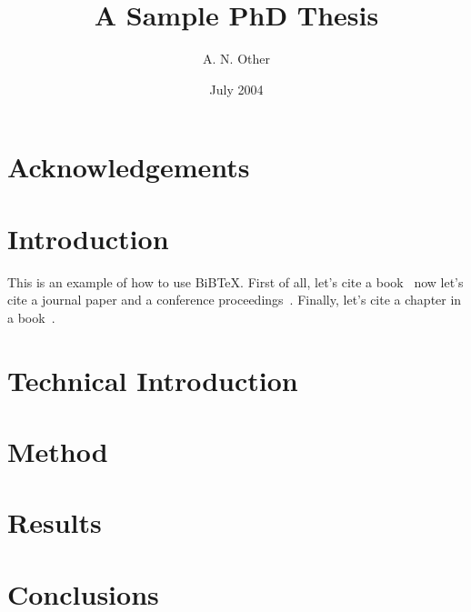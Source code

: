 \documentclass[a4paper,12pt]{report}
\begin{document}
\title{A Sample PhD Thesis}
\author{A. N. Other}
\date{July 2004}

\maketitle

\renewcommand{\baselinestretch}{1.66}

\tableofcontents
\listoffigures
\listoftables

\chapter*{Acknowledgements}

\begin{abstract}
\end{abstract}


\chapter{Introduction}
\label{ch:intro}

This is an example of how to use BiB\TeX.
First of all, let's cite a book~\cite{wainwright93}
now let's cite a journal paper and a conference proceedings~\cite{cawley96,talbot97}.
Finally, let's cite a chapter in a book~\cite[Chapter 9]{goossens97}.

\chapter{Technical Introduction}
\label{ch:techintro}

\chapter{Method}
\label{ch:method}

\chapter{Results}
\label{ch:results}

\chapter{Conclusions}
\label{ch:conc}



\end{document}
